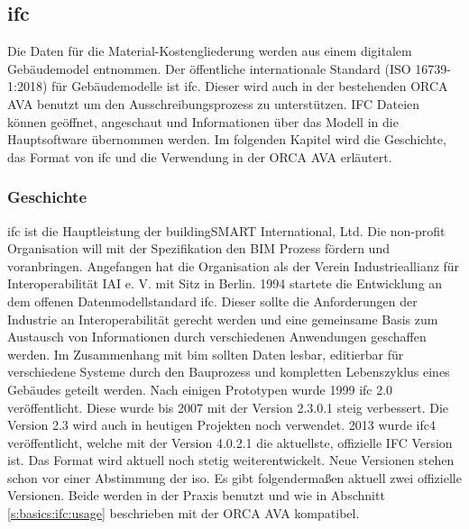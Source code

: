 \subsection{\ac{ifc}}
\label{s:basics:ifc}
Die Daten für die Material-Kostengliederung werden aus einem digitalem Gebäudemodel entnommen. Der öffentliche internationale Standard (ISO 16739-1:2018) für Gebäudemodelle ist \ac{ifc}. \citep{BuildingSMART_International_Ltd2017-gs} Dieser wird auch in der bestehenden ORCA AVA benutzt um den Ausschreibungsprozess zu unterstützen. IFC Dateien können geöffnet, angeschaut und Informationen über das Modell in die Hauptsoftware übernommen werden. Im folgenden Kapitel wird die Geschichte, das Format von \ac{ifc} und die Verwendung in der ORCA AVA erläutert.

\subsubsection{Geschichte}
\label{s:basics:ifc:history}
\ac{ifc} ist die Hauptleistung der buildingSMART International, Ltd.  Die non-profit Organisation will mit der Spezifikation den BIM Prozess fördern und voranbringen. \citep{BuildingSMART_IFC}
Angefangen hat die Organisation als der Verein Industrieallianz für Interoperabilität IAI e. V. mit Sitz in Berlin. 1994 startete die Entwicklung an dem offenen Datenmodellstandard \ac{ifc}. Dieser sollte die Anforderungen der Industrie an Interoperabilität gerecht werden und eine gemeinsame Basis zum Austausch von Informationen durch verschiedenen Anwendungen geschaffen werden. Im Zusammenhang mit \ac{bim} sollten Daten lesbar, editierbar für verschiedene Systeme durch den Bauprozess und kompletten Lebenszyklus eines Gebäudes geteilt werden. \citep{Laakso2012-oi} Nach einigen Prototypen wurde 1999 \ac{ifc} 2.0 veröffentlicht. Diese wurde bis 2007 mit der Version 2.3.0.1 steig verbessert. Die Version 2.3 wird auch in heutigen Projekten noch verwendet. 2013 wurde \ac{ifc}4 veröffentlicht, welche mit der Version 4.0.2.1 die aktuellste, offizielle IFC Version ist. Das Format wird aktuell noch stetig weiterentwickelt. Neue Versionen stehen schon vor einer Abstimmung der \ac{iso}. \citep{BuildingSMART_history_2022} Es gibt folgendermaßen aktuell zwei offizielle Versionen. Beide werden in der Praxis benutzt und wie in Abschnitt \ref{s:basics:ifc:usage} beschrieben mit der ORCA AVA kompatibel.


